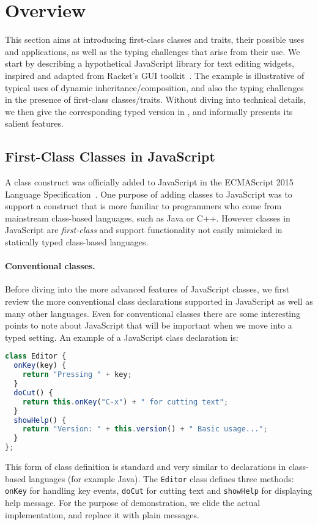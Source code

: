 
\section{Overview}
\label{sec:trait:overview}

This section aims at introducing first-class classes and traits, their possible
uses and applications, as well as the typing challenges that arise
from their use.
We start by describing a hypothetical JavaScript library for text editing
widgets, inspired and adapted from Racket's GUI
toolkit~\citep{DBLP:conf/oopsla/TakikawaSDTF12}. The example is illustrative of
typical uses of dynamic inheritance/composition, and also the typing challenges
in the presence of first-class classes/traits. Without diving into
technical details, we then give the corresponding typed version in
\sedel, and informally presents its salient features.

\subsection{First-Class Classes in JavaScript}

A class construct was officially added to JavaScript in the ECMAScript
2015 Language Specification~\citep{EcmaScript:15}. One purpose of
adding classes to JavaScript was to support a construct that is more
familiar to programmers who come from mainstream class-based languages,
such as Java or C++. However classes in JavaScript are
\emph{first-class} and support functionality not easily mimicked in
statically typed class-based languages.

\paragraph{Conventional classes.}

Before diving into the more advanced features of JavaScript classes, we first
review the more conventional class declarations supported in JavaScript as well
as many other languages. Even for conventional classes there are some
interesting points to note about JavaScript that will be important when we move
into a typed setting. An example of a JavaScript class declaration is:
\begin{lstlisting}[language=JavaScript]
class Editor {
  onKey(key) {
    return "Pressing " + key;
  }
  doCut() {
    return this.onKey("C-x") + " for cutting text";
  }
  showHelp() {
    return "Version: " + this.version() + " Basic usage...";
  }
};
\end{lstlisting}
This form of class definition is standard and very similar to declarations in
class-based languages (for example Java). The \lstinline{Editor} class
defines three methods: \lstinline{onKey} for handling key events,
\lstinline{doCut} for cutting text and \lstinline{showHelp} for displaying help
message. For the purpose of demonstration, we elide the actual implementation,
and replace it with plain messages.

